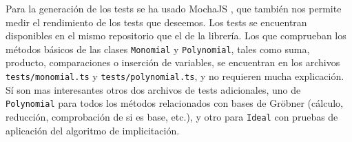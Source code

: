 Para la generación de los tests se ha usado MochaJS \cite{mocha}, que también nos permite medir el rendimiento de los tests que deseemos. Los tests se encuentran disponibles en el mismo repositorio que el de la librería. Los que comprueban los métodos básicos de las clases \texttt{Monomial} y \texttt{Polynomial}, tales como suma, producto, comparaciones o inserción de variables, se encuentran en los archivos \texttt{tests/monomial.ts} y \texttt{tests/polynomial.ts}, y no requieren mucha explicación. Sí son mas interesantes otros dos archivos de tests adicionales, uno de \texttt{Polynomial} para todos los métodos relacionados con bases de Gröbner (cálculo, reducción, comprobación de si es base, etc.), y otro para \texttt{Ideal} con pruebas de aplicación del algoritmo de implicitación.\newline

